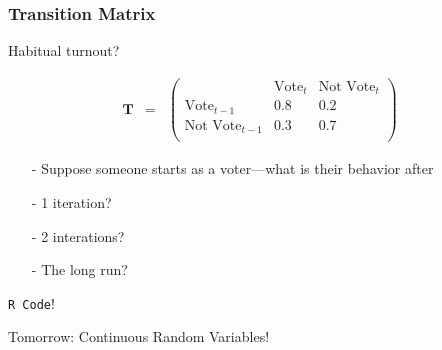 \documentclass{beamer}
\numberwithin{equation}{section}
\begin{document}
\begin{frame}
\frametitle{Transition Matrix}

Habitual turnout?


\begin{eqnarray}
\boldsymbol{T} & = & 
\begin{pmatrix}
				  & \text{Vote}_{t} & \text{Not Vote}_{t}\\
\text{Vote}_{t-1} & 0.8 & 0.2 \\ 
\text{Not Vote}_{t-1} &  0.3 & 0.7\\
\end{pmatrix} \nonumber 
\end{eqnarray}

\begin{itemize}
\item[-] Suppose someone starts as a voter---what is their behavior after
\item[-] 1 iteration?
\item[-] 2 interations?
\item[-] The long run?
\end{itemize}

{\tt R Code}!


\end{frame}





\begin{frame}

Tomorrow: Continuous Random Variables!


\end{frame}
\end{document}
